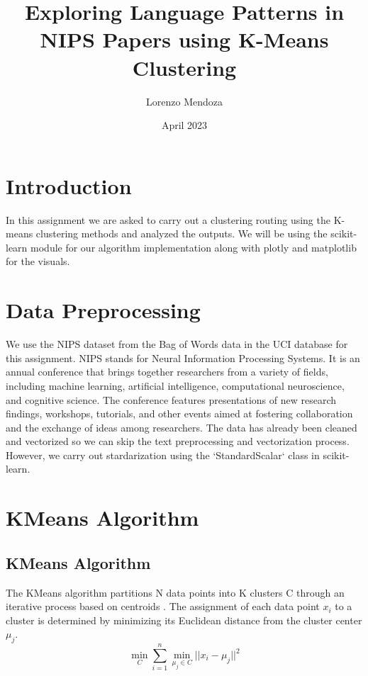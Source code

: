 \documentclass{article}
\title{Exploring Language Patterns in NIPS Papers using K-Means Clustering}
\author{Lorenzo Mendoza}
\date{April 2023}
\begin{document}
\maketitle

\section{Introduction}
In this assignment we are asked to carry out a clustering routing using the K-means clustering methods and analyzed the outputs. We will be using the scikit-learn \cite{scikit-learn-clustering} module for our algorithm implementation along with plotly \cite{Plotly} and matplotlib \cite{Matplotlib} for the visuals.

\section{Data Preprocessing}
We use the NIPS dataset from the Bag of Words data \cite{Dua2019} in the UCI database for this assignment. NIPS stands for Neural Information Processing Systems. It is an annual conference that brings together researchers from a variety of fields, including machine learning, artificial intelligence, computational neuroscience, and cognitive science. The conference features presentations of new research findings, workshops, tutorials, and other events aimed at fostering collaboration and the exchange of ideas among researchers. The data has already been cleaned and vectorized so we can skip the text preprocessing and vectorization process. However, we carry out stardarization using the ‘StandardScalar‘ class in scikit-learn.



\section{KMeans Algorithm}
\subsection{KMeans Algorithm}
The KMeans algorithm partitions N data points into K clusters C through an iterative process based on centroids \cite{satishgunjal-kmeans-tutorial}. The assignment of each data point $x_i$ to a cluster is determined by minimizing its Euclidean distance from the cluster center $\mu_j$.
\begin{equation}
\min_{C} \sum_{i=1}^{n} \min_{\mu_j \in C} ||x_i - \mu_j||^2
\end{equation}
\end{document}
